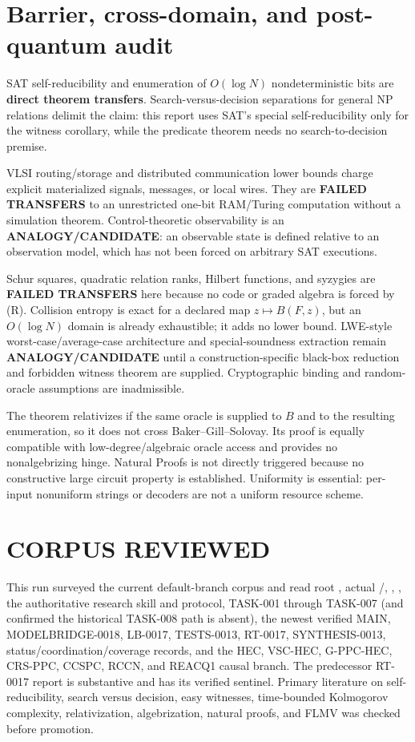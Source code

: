 \documentclass[11pt]{article}
\begin{document}
\section{Barrier, cross-domain, and post-quantum audit}

SAT self-reducibility and enumeration of $O(\log N)$ nondeterministic bits are \textbf{direct theorem transfers}.  Search-versus-decision separations for general NP relations delimit the claim: this report uses SAT's special self-reducibility only for the witness corollary, while the predicate theorem needs no search-to-decision premise.

VLSI routing/storage and distributed communication lower bounds charge explicit materialized signals, messages, or local wires.  They are \textbf{FAILED TRANSFERS} to an unrestricted one-bit RAM/Turing computation without a simulation theorem.  Control-theoretic observability is an \textbf{ANALOGY/CANDIDATE}: an observable state is defined relative to an observation model, which has not been forced on arbitrary SAT executions.

Schur squares, quadratic relation ranks, Hilbert functions, and syzygies are \textbf{FAILED TRANSFERS} here because no code or graded algebra is forced by (R).  Collision entropy is exact for a declared map $z\mapsto B(F,z)$, but an $O(\log N)$ domain is already exhaustible; it adds no lower bound.  LWE-style worst-case/average-case architecture and special-soundness extraction remain \textbf{ANALOGY/CANDIDATE} until a construction-specific black-box reduction and forbidden witness theorem are supplied.  Cryptographic binding and random-oracle assumptions are inadmissible.

The theorem relativizes if the same oracle is supplied to $B$ and to the resulting enumeration, so it does not cross Baker--Gill--Solovay.  Its proof is equally compatible with low-degree/algebraic oracle access and provides no nonalgebrizing hinge.  Natural Proofs is not directly triggered because no constructive large circuit property is established.  Uniformity is essential: per-input nonuniform strings or decoders are not a uniform resource scheme.

\section{CORPUS REVIEWED}

This run surveyed the current default-branch corpus and read root , actual /, , , the authoritative research skill and protocol, TASK-001 through TASK-007 (and confirmed the historical TASK-008 path is absent), the newest verified MAIN, MODELBRIDGE-0018, LB-0017, TESTS-0013, RT-0017, SYNTHESIS-0013, status/coordination/coverage records, and the HEC, VSC-HEC, G-PPC-HEC, CRS-PPC, CCSPC, RCCN, and REACQ1 causal branch.  The predecessor RT-0017 report is substantive and has its verified sentinel.  Primary literature on self-reducibility, search versus decision, easy witnesses, time-bounded Kolmogorov complexity, relativization, algebrization, natural proofs, and FLMV was checked before promotion.
\end{document}
